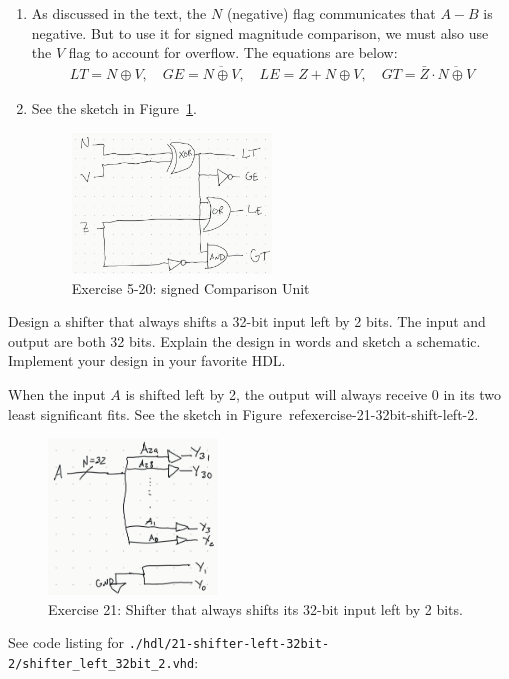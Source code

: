 \documentclass[12pt]{article}
\newenvironment{ex}[2][Exercise]{\begin{trivlist}
		\item[\hskip \labelsep {\bfseries #1}\hskip \labelsep {\bfseries #2.}]}{\end{trivlist}}
\newenvironment{sol}[1][Solution]{\begin{trivlist}
		\item[\hskip \labelsep {\bfseries #1:}]}{\end{trivlist}}
\begin{document}
\begin{sol}
	\begin{enumerate}[label=(\alph*)]
		\item As discussed in the text, the $N$ (negative) flag communicates
		that $A-B$ is negative. But to use it for signed magnitude comparison,
		we must also use the $V$ flag to account for overflow. The equations
		are below:
		\begin{align*}
			LT=N\oplus V,\quad GE=\overline{N\oplus V},
			\quad LE=Z+N\oplus V,\quad GT=\bar{Z}\cdot \overline{N\oplus V}
		\end{align*}
		\item See the sketch in Figure~\ref{signed-comparison-unit}.
		\begin{figure}
			\centering
			\includegraphics[width=0.5\textwidth]{exercise-05-20-signed-comparison-unit}
			\caption{Exercise 5-20: signed Comparison Unit}
			\label{signed-comparison-unit}
		\end{figure}
	\end{enumerate}
\end{sol}

\begin{ex}{5.21}
	Design a shifter that always shifts a 32-bit input left by 2 bits. The input and
	output are both 32 bits. Explain the design in words and sketch a schematic.
	Implement your design in your favorite HDL.
\end{ex}

\begin{sol}
	When the input $A$ is shifted left by 2, the output will always receive 0 in its
	two least significant fits. See the sketch in Figure~ref{exercise-21-32bit-shift-left-2}.
	\begin{figure}
		\centering
		\includegraphics[width=0.4\textwidth]{exercise-21-32bit-shift-left-2}
		\caption{Exercise 21: Shifter that always shifts its 32-bit input left by
		2 bits.}
		\label{exercise-21-32bit-shift-left-2}
	\end{figure}
	See code listing for
	\texttt{./hdl/21-shifter-left-32bit-2/shifter\_left\_32bit\_2.vhd}:
	
\end{sol}
\end{document}
